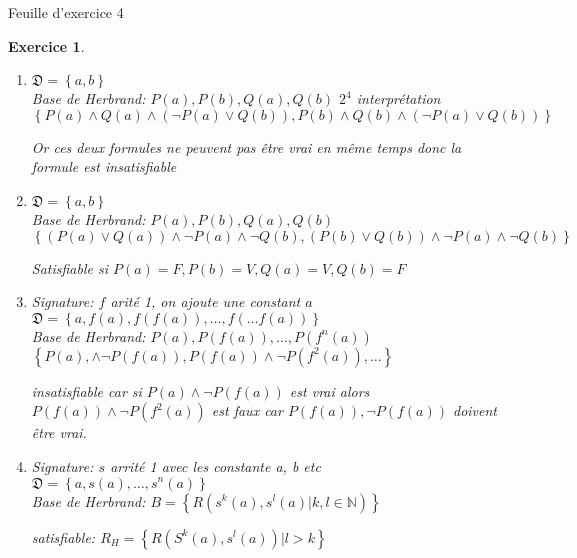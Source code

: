 \documentclass{article}
\theoremstyle{plain}
\newtheorem{exo}{Exercice}%
\begin{document}
\begin{center}
    \large\sc Feuille d'exercice 4
\end{center}

\begin{exo}
\begin{enumerate}
    \item $\mathfrak{D} = \left\{a,b\right\}$\\
        Base de Herbrand: $P(a), P(b), Q(a), Q(b)$ $2^4$ interprétation\\
        $\left\{P(a) \wedge Q(a) \wedge (\neg P(a) \vee Q(b)), 
                P(b) \wedge Q(b) \wedge (\neg P(a) \vee Q(b))\right\}$ 
                
        Or ces deux formules ne peuvent pas être vrai en même temps donc la formule est insatisfiable
    \item $\mathfrak{D} = \left\{a,b\right\}$ \\
        Base de Herbrand: $P(a), P(b), Q(a), Q(b)$\\
        $\left\{(P(a) \vee Q(a)) \wedge \neg P(a) \wedge \neg Q(b), 
                (P(b) \vee Q(b)) \wedge \neg P(a) \wedge \neg Q(b)\right\}$

        Satisfiable si $P(a) = F, P(b) = V, Q(a) = V, Q(b) = F$

    \item Signature: $f$ arité 1, on ajoute une constant $a$\\
        $\mathfrak{D} = \left\{a, f(a), f(f(a)), \ldots, f(\ldots f(a))\right\}$ \\
        Base de Herbrand: $P(a), P(f(a)), \ldots, P(f^n(a))$\\
        $\left\{P(a), \wedge \neg P(f(a)), P(f(a)) \wedge \neg P(f^2(a)), \ldots\right\}$

        insatisfiable car si $P(a) \wedge \neg P(f(a))$ 
        est vrai alors $P(f(a)) \wedge \neg P(f^2(a))$ est faux car $P(f(a)), \neg P(f(a))$ 
        doivent être vrai.

    \item Signature: $s$ arrité 1 avec les constante a, b etc\\
        $\mathfrak{D} = \left\{a, s(a), \ldots, s^n(a)\right\}$\\
        Base de Herbrand: $B = \left\{R(s^k(a), s^l(a) | k, l \in \mathbb{N})\right\}$

        satisfiable: $R_H = \left\{R(S^k(a), s^l(a)) | l > k\right\} $
        
\end{enumerate}
\end{exo}
\end{document}
